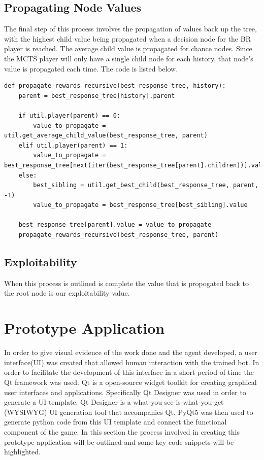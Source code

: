 \subsection{Propagating Node Values}\label{subsec:propagateTerminals}
The final step of this process involves the propagation of values back up the tree, with the highest
child value being propagated when a decision node for the BR player is reached.
The average child value is propagated for chance nodes.
Since the MCTS player will only have a single child node for each history, that node's value is
propagated each time.
The code is listed below.

\begin{lstlisting}[style=Python]
def propagate_rewards_recursive(best_response_tree, history):
    parent = best_response_tree[history].parent

    if util.player(parent) == 0:
        value_to_propagate = util.get_average_child_value(best_response_tree, parent)
    elif util.player(parent) == 1:
        value_to_propagate = best_response_tree[next(iter(best_response_tree[parent].children))].value
    else:
        best_sibling = util.get_best_child(best_response_tree, parent, -1)
        value_to_propagate = best_response_tree[best_sibling].value

    best_response_tree[parent].value = value_to_propagate
    propagate_rewards_recursive(best_response_tree, parent)
\end{lstlisting}

\subsection{Exploitability}\label{subsec:exploitability}
When this process is outlined is complete the value that is propogated back to the
root node is our exploitability value.

\section{Prototype Application}\label{sec:prototypeApp}
In order to give visual evidence of the work done and the agent developed, a user interface(UI) was created
that allowed human interaction with the trained bot.
In order to facilitate the development of this interface in a short period of time the Qt framework was used.
Qt is a open-source widget toolkit for creating graphical user interfaces and applications.
Specifically Qt Designer was used in order to generate a UI template.
Qt Designer is a what-you-see-is-what-you-get (WYSIWYG) UI generation tool that accompanies Qt.
PyQt5 was then used to generate python code from this UI template and connect the functional component of the game.
In this section the process involved in creating this prototype application will be outlined
and some key code snippets will be highlighted.

